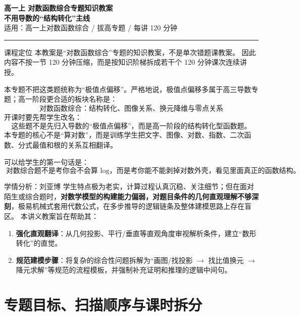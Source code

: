 \documentclass[11pt,a4paper]{ctexart}
\begin{document}
\begin{center}
  {\bfseries 高一上 \quad 对数函数综合专题知识教案}\\[3mm]
  {\Large \bfseries 不用导数的“结构转化”主线}\\[2mm]
  {\large 适用：高一上对数函数综合 / 拔高专题 / 每讲 120 分钟}\\[2mm]
  \rule{0.85\linewidth}{0.5pt}
\end{center}

\begin{teachbox}{课程定位}
本教案是“对数函数综合”专题的知识教案，不是单次错题课教案。
因此内容不按一节 120 分钟压缩，而是按知识阶梯拆成若干个 120 分钟课次连续讲授。

本专题不把这类题统称为“极值点偏移”。严格地说，极值点偏移多属于高三导数专题；高一阶段更合适的板块名称是：
\[
\boxed{\text{对数函数综合：结构转化、图像关系、换元降维与零点关系}}
\]
开课时要先帮学生改名：
\[
\boxed{\text{这些题不是先归入导数的“极值点偏移”，而是高一阶段的结构转化型函数题。}}
\]
本专题的核心不是“算对数”，而是训练学生把文字、图像、对数、指数、二次函数、分式最值和根的关系互相翻译。

可以给学生的第一句话是：
\[
\boxed{\text{对数综合题不是考你会不会算 }\log\text{，而是考你能不能剥掉对数外壳，看见里面真正的函数结构。}}
\]
\end{teachbox}

\begin{teachbox}{学情分析：刘亚博}
学生特点极为老实，计算过程认真沉稳、关注细节；但在面对陌生或综合题时，\textbf{对数学模型的构建能力偏弱，对题目条件的几何直观理解不够深刻}，极易机械式套用代数公式，在多步推导的逻辑链条及整体建模思路上存在盲区。
本讲义教案旨在帮助其：
\begin{enumerate}
  \item \textbf{强化直观翻译}：从几何投影、平行/垂直等直观角度审视解析条件，建立“数形转化”的直觉。
  \item \textbf{规范建模步骤}：将复杂的综合性问题拆解为“画图/找投影 $\to$ 找比值换元 $\to$ 降元求解”等规范的流程模板，并强制补充证明和推理的逻辑中间句。
\end{enumerate}
\end{teachbox}

\section{专题目标、扫描顺序与课时拆分}
\end{document}
